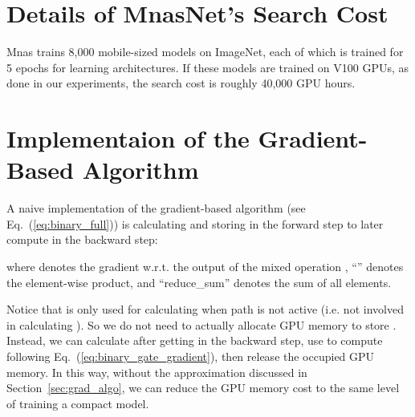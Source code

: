\documentclass{article} \usepackage{iclr2019_conference,times}
\begin{document}
\section{Details of MnasNet's Search Cost}\label{sec:mnas_cost}
Mnas \citep{tan2018mnasnet} trains 8,000 mobile-sized models on ImageNet, each of which is trained for 5 epochs for learning architectures. If these models are trained on V100 GPUs, as done in our experiments, the search cost is roughly 40,000 GPU hours. 

\section{Implementaion of the Gradient-Based Algorithm}\label{sec:grad_discussion}
A naive implementation of the gradient-based algorithm (see Eq.~(\ref{eq:binary_full})) is calculating and storing  in the forward step to later compute  in the backward step:

where  denotes the gradient w.r.t. the output of the mixed operation , ``'' denotes the element-wise product, and ``reduce\_sum'' denotes the sum of all elements.

Notice that  is only used for calculating  when  path is not active (i.e. not involved in calculating ). So we do not need to actually allocate GPU memory to store . Instead, we can calculate  after getting  in the backward step, use  to compute  following Eq.~(\ref{eq:binary_gate_gradient}), then release the occupied GPU memory. 
In this way, without the approximation discussed in Section~\ref{sec:grad_algo}, we can reduce the GPU memory cost to the same level of training a compact model. 
\end{document}
